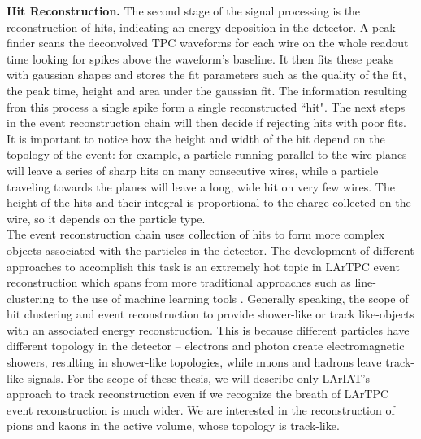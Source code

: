 \textbf{Hit Reconstruction.} The second stage of the signal processing is the reconstruction of hits, indicating an energy deposition in the detector.  A peak finder scans the deconvolved TPC waveforms for each wire on the whole readout time looking for spikes  above  the waveform's baseline. It then fits these peaks with gaussian shapes and stores the fit parameters such as the quality of the fit, the peak time, height and area under the gaussian fit. The information resulting fron this process a single spike form a single reconstructed ``hit".
The next steps in the event reconstruction chain will then decide if rejecting hits with poor fits.
It is important to notice how the height and width of the hit depend on the topology of the event: for example, a particle running  parallel to the wire planes will leave a series of sharp hits on many consecutive wires, while a particle traveling towards the planes will leave a long, wide hit on very few wires. The height of the hits and their integral is proportional to the charge collected on the wire, so it depends on the particle type.\\

The event reconstruction chain uses collection of hits to form more complex objects associated with the particles in the detector. The development of different approaches to accomplish this task is an extremely hot topic in LArTPC event reconstruction which spans from more traditional approaches such as line-clustering  \cite{Barker2011} to the use of machine learning tools \cite{1748-0221-12-03-P03011}. Generally speaking, the scope of hit clustering and event reconstruction to provide shower-like or track like-objects with an associated energy reconstruction. This is because different particles have different topology in the detector -- electrons and photon create electromagnetic showers,  resulting in shower-like topologies, while muons and hadrons  leave track-like signals.  For the scope of these thesis, we will describe only LArIAT's approach to track reconstruction even if we recognize the breath of LArTPC event reconstruction is much wider. We are interested in the reconstruction of pions and kaons in the active volume, whose topology is track-like.\\

